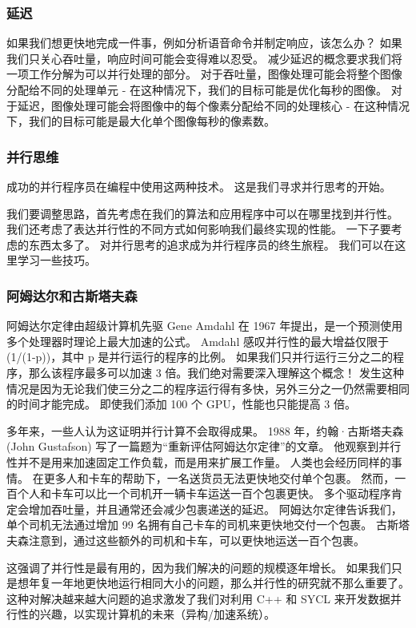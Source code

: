 \subsubsection{延迟}
如果我们想更快地完成一件事，例如分析语音命令并制定响应，该怎么办？ 如果我们只关心吞吐量，响应时间可能会变得难以忍受。 减少延迟的概念要求我们将一项工作分解为可以并行处理的部分。 对于吞吐量，图像处理可能会将整个图像分配给不同的处理单元 - 在这种情况下，我们的目标可能是优化每秒的图像。 对于延迟，图像处理可能会将图像中的每个像素分配给不同的处理核心 - 在这种情况下，我们的目标可能是最大化单个图像每秒的像素数。

\subsubsection{并行思维}
成功的并行程序员在编程中使用这两种技术。 这是我们寻求并行思考的开始。

我们要调整思路，首先考虑在我们的算法和应用程序中可以在哪里找到并行性。 我们还考虑了表达并行性的不同方式如何影响我们最终实现的性能。 一下子要考虑的东西太多了。 对并行思考的追求成为并行程序员的终生旅程。 我们可以在这里学习一些技巧。

\subsubsection{阿姆达尔和古斯塔夫森}
阿姆达尔定律由超级计算机先驱 Gene Amdahl 在 1967 年提出，是一个预测使用多个处理器时理论上最大加速的公式。 Amdahl 感叹并行性的最大增益仅限于 (1/(1-p))，其中 p 是并行运行的程序的比例。 如果我们只并行运行三分之二的程序，那么该程序最多可以加速 3 倍。我们绝对需要深入理解这个概念！ 发生这种情况是因为无论我们使三分之二的程序运行得有多快，另外三分之一仍然需要相同的时间才能完成。 即使我们添加 100 个 GPU，性能也只能提高 3 倍。

多年来，一些人认为这证明并行计算不会取得成果。 1988 年，约翰·古斯塔夫森 (John Gustafson) 写了一篇题为“重新评估阿姆达尔定律”的文章。 他观察到并行性并不是用来加速固定工作负载，而是用来扩展工作量。 人类也会经历同样的事情。 在更多人和卡车的帮助下，一名送货员无法更快地交付单个包裹。 然而，一百个人和卡车可以比一个司机开一辆卡车运送一百个包裹更快。 多个驱动程序肯定会增加吞吐量，并且通常还会减少包裹递送的延迟。 阿姆达尔定律告诉我们，单个司机无法通过增加 99 名拥有自己卡车的司机来更快地交付一个包裹。 古斯塔夫森注意到，通过这些额外的司机和卡车，可以更快地运送一百个包裹。

这强调了并行性是最有用的，因为我们解决的问题的规模逐年增长。 如果我们只是想年复一年地更快地运行相同大小的问题，那么并行性的研究就不那么重要了。 这种对解决越来越大问题的追求激发了我们对利用 C++ 和 SYCL 来开发数据并行性的兴趣，以实现计算机的未来（异构/加速系统）。

